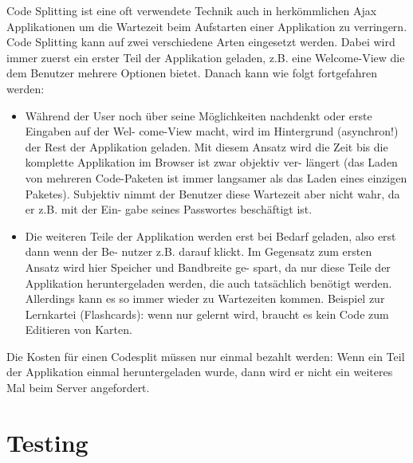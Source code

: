 \documentclass[a4paper,10pt]{scrreprt}
\begin{document}
Code Splitting ist eine oft verwendete Technik auch in herkömmlichen Ajax Applikationen um die
Wartezeit beim Aufstarten einer Applikation zu verringern. Code Splitting kann auf zwei verschiedene
Arten eingesetzt werden. Dabei wird immer zuerst ein erster Teil der Applikation geladen, z.B. eine
Welcome-View die dem Benutzer mehrere Optionen bietet. Danach kann wie folgt fortgefahren
werden:
\begin{itemize}
\item Während der User noch über seine Möglichkeiten nachdenkt oder erste Eingaben auf der Wel-
come-View macht, wird im Hintergrund (asynchron!) der Rest der Applikation geladen.
Mit diesem Ansatz wird die Zeit bis die komplette Applikation im Browser ist zwar objektiv ver-
längert (das Laden von mehreren Code-Paketen ist immer langsamer als das Laden eines einzigen
Paketes). Subjektiv nimmt der Benutzer diese Wartezeit aber nicht wahr, da er z.B. mit der Ein-
gabe seines Passwortes beschäftigt ist.
\item Die weiteren Teile der Applikation werden erst bei Bedarf geladen, also erst dann wenn der Be-
nutzer z.B. darauf klickt. Im Gegensatz zum ersten Ansatz wird hier Speicher und Bandbreite ge-
spart, da nur diese Teile der Applikation heruntergeladen werden, die auch tatsächlich benötigt
werden. Allerdings kann es so immer wieder zu Wartezeiten kommen. Beispiel zur Lernkartei
(Flashcards): wenn nur gelernt wird, braucht es kein Code zum Editieren von Karten.

\end{itemize}
Die Kosten für einen Codesplit müssen nur einmal bezahlt werden: Wenn ein Teil der Applikation
einmal heruntergeladen wurde, dann wird er nicht ein weiteres Mal beim Server angefordert.

\chapter{Testing}
\end{document}
